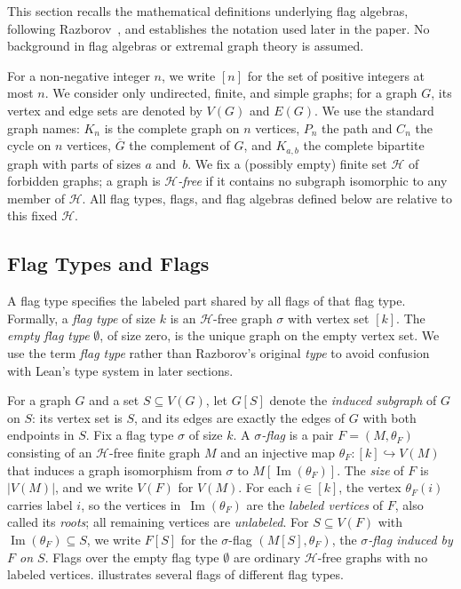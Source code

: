 \documentclass[acmsmall,screen=true,acmthm=false]{acmart}
\newcommand{\boldparagraph}[1]{\noindentparagraph{\textnormal{\textbf{#1}}}}
\begin{document}
This section recalls the mathematical definitions underlying flag algebras,
following Razborov~\cite{razborov2007flag}, and establishes the notation used
later in the paper.  No background in flag algebras or extremal graph theory
is assumed.

\boldparagraph{Notation.}
For a non-negative integer $n$, we write $[n]$ for the set of positive integers
at most $n$.  We consider only undirected, finite, and simple graphs; for a
graph $G$, its vertex and edge sets are denoted by $V(G)$ and $E(G)$.  We use
the standard graph names: $K_n$ is the complete graph on $n$ vertices, $P_n$
the path and $C_n$ the cycle on $n$ vertices, $\overline{G}$ the complement of
$G$, and $K_{a,b}$ the complete bipartite graph with parts of sizes $a$
and~$b$.  We fix a (possibly empty) finite set $\mathcal{H}$ of forbidden
graphs; a graph is \emph{\(\mathcal{H}\)-free} if it contains no subgraph
isomorphic to any member of $\mathcal{H}$.  All flag types, flags, and flag
algebras defined below are relative to this fixed $\mathcal{H}$.

\subsection{Flag Types and Flags}
\label{sec:background-flags}

\boldparagraph{Flag Types.}
A flag type specifies the labeled part shared by all flags of that flag type.
Formally, a \emph{flag type} of size $k$ is an \(\mathcal{H}\)-free graph
\(\sigma\) with vertex set $[k]$.  The \emph{empty flag type} $\emptyset$, of
size zero, is the unique graph on the empty vertex set.
We use the term \emph{flag type} rather than Razborov's original \emph{type}
to avoid confusion with Lean's type system in later sections.

\boldparagraph{Flags.}
For a graph $G$ and a set $S\subseteq V(G)$, let $G[S]$ denote the
\emph{induced subgraph} of $G$ on $S$: its vertex set is $S$, and its edges are
exactly the edges of $G$ with both endpoints in $S$.
Fix a flag type $\sigma$ of size $k$.
A \emph{$\sigma$-flag} is a pair $F = (M, \theta_F)$ consisting of an
\(\mathcal{H}\)-free finite graph $M$ and an injective map
$\theta_F : [k] \hookrightarrow V(M)$ that induces a graph isomorphism from
$\sigma$ to $M[\operatorname{Im}(\theta_F)]$.  The \emph{size} of $F$ is
$|V(M)|$, and we write $V(F)$ for $V(M)$.
For each $i\in[k]$, the vertex $\theta_F(i)$ carries label $i$, so the vertices
in~$\operatorname{Im}(\theta_F)$ are the \emph{labeled vertices} of $F$, also
called its \emph{roots}; all remaining vertices are \emph{unlabeled}.
For $S \subseteq V(F)$ with $\operatorname{Im}(\theta_F) \subseteq S$,
we write $F[S]$ for the $\sigma$-flag $(M[S], \theta_F)$, the
\emph{$\sigma$-flag induced by $F$ on $S$}.
Flags over the empty flag type $\emptyset$ are ordinary
\(\mathcal{H}\)-free graphs with no labeled vertices.
 illustrates several flags of different flag types.
\end{document}

